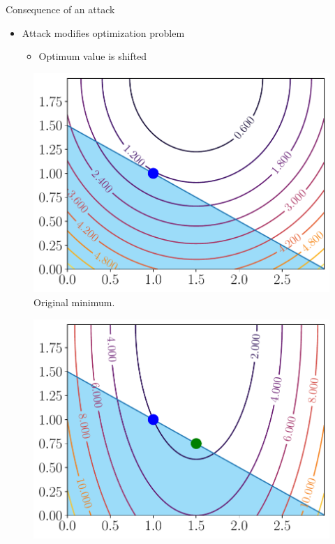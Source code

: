 \documentclass[aspectratio=169]{beamer}
\begin{document}
\begin{frame}{Consequence of an attack}
  \begin{overlayarea}{\textwidth}{.5\textwidth}
    \begin{itemize}[<+(1)->]
      \item Attack modifies optimization problem
            \begin{itemize}[<+(1)->]
              \item Optimum value is shifted
            \end{itemize}
    \end{itemize}
      \begin{minipage}[t]{.450\linewidth}
          \begin{figure}[h]
            \centering
            \includegraphics[width=\textwidth]{../img/resilient_eq/original-minimum.pdf}
            \caption*{Original minimum.}\label{fig:original_minimum}
          \end{figure}
      \end{minipage}
      \hfill
      \begin{minipage}[t]{.45\linewidth}
          \begin{figure}[h]
            \centering
            \includegraphics[width=\textwidth]{../img/resilient_eq/new-minimum-selfish.pdf}

\end{figure}
\end{minipage}
\end{overlayarea}
\end{frame}
\end{document}
